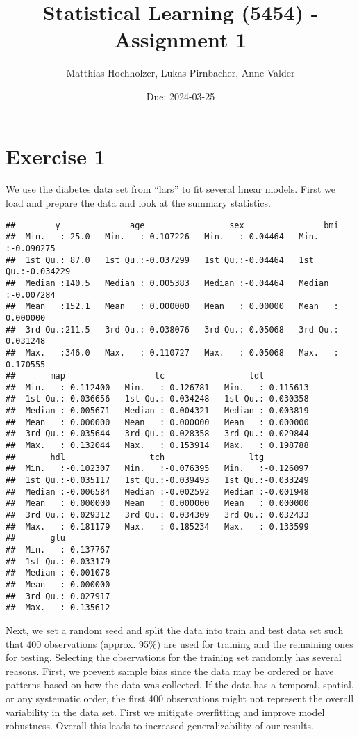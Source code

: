 \documentclass[
]{article}
\title{Statistical Learning (5454) - Assignment 1}
\author{Matthias Hochholzer, Lukas Pirnbacher, Anne Valder}
\date{Due: 2024-03-25}
\begin{document}
\maketitle

\hypertarget{exercise-1}{%
\section{Exercise 1}\label{exercise-1}}

We use the diabetes data set from ``lars'' to fit several linear models.
First we load and prepare the data and look at the summary statistics.

\begin{verbatim}
##        y              age                 sex                bmi           
##  Min.   : 25.0   Min.   :-0.107226   Min.   :-0.04464   Min.   :-0.090275  
##  1st Qu.: 87.0   1st Qu.:-0.037299   1st Qu.:-0.04464   1st Qu.:-0.034229  
##  Median :140.5   Median : 0.005383   Median :-0.04464   Median :-0.007284  
##  Mean   :152.1   Mean   : 0.000000   Mean   : 0.00000   Mean   : 0.000000  
##  3rd Qu.:211.5   3rd Qu.: 0.038076   3rd Qu.: 0.05068   3rd Qu.: 0.031248  
##  Max.   :346.0   Max.   : 0.110727   Max.   : 0.05068   Max.   : 0.170555  
##       map                  tc                 ldl           
##  Min.   :-0.112400   Min.   :-0.126781   Min.   :-0.115613  
##  1st Qu.:-0.036656   1st Qu.:-0.034248   1st Qu.:-0.030358  
##  Median :-0.005671   Median :-0.004321   Median :-0.003819  
##  Mean   : 0.000000   Mean   : 0.000000   Mean   : 0.000000  
##  3rd Qu.: 0.035644   3rd Qu.: 0.028358   3rd Qu.: 0.029844  
##  Max.   : 0.132044   Max.   : 0.153914   Max.   : 0.198788  
##       hdl                 tch                 ltg           
##  Min.   :-0.102307   Min.   :-0.076395   Min.   :-0.126097  
##  1st Qu.:-0.035117   1st Qu.:-0.039493   1st Qu.:-0.033249  
##  Median :-0.006584   Median :-0.002592   Median :-0.001948  
##  Mean   : 0.000000   Mean   : 0.000000   Mean   : 0.000000  
##  3rd Qu.: 0.029312   3rd Qu.: 0.034309   3rd Qu.: 0.032433  
##  Max.   : 0.181179   Max.   : 0.185234   Max.   : 0.133599  
##       glu           
##  Min.   :-0.137767  
##  1st Qu.:-0.033179  
##  Median :-0.001078  
##  Mean   : 0.000000  
##  3rd Qu.: 0.027917  
##  Max.   : 0.135612
\end{verbatim}

Next, we set a random seed and split the data into train and test data
set such that 400 observations (approx. 95\%) are used for training and
the remaining ones for testing. Selecting the observations for the
training set randomly has several reasons. First, we prevent sample bias
since the data may be ordered or have patterns based on how the data was
collected. If the data has a temporal, spatial, or any systematic order,
the first 400 observations might not represent the overall variability
in the data set. First we mitigate overfitting and improve model
robustness. Overall this leads to increased generalizability of our
results.
\end{document}
